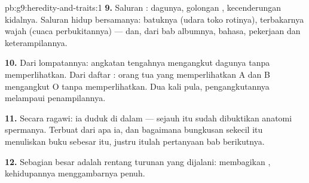 \begin{solution}{pb:g9:heredity-and-traits:1}
\textbf{9.} Saluran : dagunya, golongan ,
kecenderungan kidalnya. Saluran hidup bersamanya: batuknya
(udara toko rotinya), terbakarnya wajah (cuaca perbukitannya)
--- dan, dari bab albumnya, bahasa, pekerjaan dan
keterampilannya.

\textbf{10.} Dari lompatannya: angkatan tengahnya mengangkut
dagunya tanpa memperlihatkan. Dari daftar : orang
tua yang memperlihatkan A dan B mengangkut O tanpa
memperlihatkan. Dua kali pula, pengangkutannya melampaui
penampilannya.

\textbf{11.} Secara ragawi: ia duduk di dalam 
 --- sejauh itu sudah dibuktikan anatomi spermanya.
Terbuat dari apa ia, dan bagaimana bungkusan sekecil itu
menuliskan buku sebesar itu, justru itulah pertanyaan bab
berikutnya.

\textbf{12.} Sebagian besar  adalah rentang turunan
yang dijalani:  membagikan , kehidupannya
menggambarnya penuh.
\end{solution}
